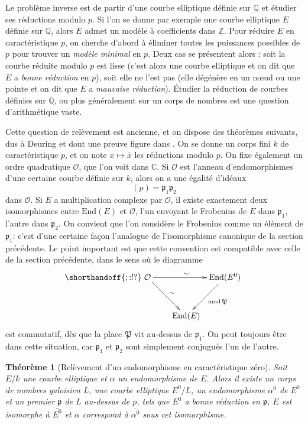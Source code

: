 \documentclass[11pt,a4paper]{article}
\newcommand{\Z}{\mathbb{Z}}
\newcommand{\C}{\mathbb{C}}
\newcommand{\Q}{\mathbb{Q}}
\renewcommand{\O}{\mathcal{O}}
\newcommand{\End}{\mathrm{End}}
\renewcommand{\frak}{\mathfrak}
\renewcommand{\v}{\vspace{5mm}}
\newtheorem*{thm}{Théorème}
\theoremstyle{definition}
\begin{document}
Le problème inverse est de partir d'une courbe elliptique définie sur $\Q$ et étudier ses réductions modulo $p$. Si l'on se donne par exemple une courbe elliptique $E$ définie sur $\Q$, alors $E$ admet un modèle à coefficients dans $\Z$. Pour réduire $E$ en caractéristique $p$, on cherche d'abord à éliminer toutes les puissances possibles de $p$ pour trouver un \emph{modèle minimal} en $p$. Deux cas se présentent alors : soit la courbe réduite modulo $p$ est lisse (c'est alors une courbe elliptique et on dit que $E$ a \emph{bonne réduction} en $p$), soit elle ne l'est pas (elle dégénère en un n\oe ud ou une pointe et on dit que $E$ a \emph{mauvaise réduction}). Étudier la réduction de courbes définies sur $\Q$, ou plus généralement sur un corps de nombres est une question d'arithmétique vaste.

\v

Cette question de relèvement est ancienne, et on dispose des théorèmes suivants, dus à Deuring et dont une preuve figure dans \cite{Lang}. On se donne un corps fini $k$ de caractéristique $p$, et on note $x\mapsto\bar{x}$ les réductions modulo $p$. On fixe également un ordre quadratique $\O$, que l'on voit dans $\C$. Si $\O$ est l'anneau d'endomorphismes d'une certaine courbe définie sur $k$, alors on a une égalité d'idéaux
$$(p) = \frak{p}_1 \frak{p}_2$$
dans $\O$. Si $E$ a multiplication complexe par $\O$, il existe exactement deux isomorphismes entre $\End(E)$ et $\O$, l'un envoyant le Frobenius de $E$ dans $\frak p_1$, l'autre dans $\frak p_2$. On convient que l'on considère le Frobenius comme un élément de $\frak p_1$: c'est d'une certaine façon l'analogue de l'isomorphisme canonique de la section précédente. Le point important est que cette convention est compatible avec celle de la section précédente, dans le sens où le diagramme
$$
\shorthandoff{;:!?}
\xymatrix @!=8mm {
\O \ar[rr]^\sim \ar[rd]^\sim & & \End(E^0) \ar[ld]^{\mathrm{mod}\,\frak P} \\
 & \End(E) & 
}
$$
est commutatif, dès que la place $\frak P$ vit au-dessus de $\frak p_1$. On peut toujours être dans cette situation, car $\frak p_1$ et $\frak p_2$ sont simplement conjugués l'un de l'autre.


\begin{thm}[Relèvement d'un endomorphisme en caractéristique zéro]

Soit $E/k$ une courbe elliptique et $\alpha$ un endomorphisme de $E$. Alors il existe un corps de nombres galoisien $L$, une courbe elliptique $E^0/L$, un endomorphisme $\alpha^0$ de $E^0$ et un premier $\frak p$ de $L$ au-dessus de $p$, tels que $E^0$ a bonne réduction en $\frak p$, $E$ est isomorphe à $\bar{E^0}$ et $\alpha$ correspond à $\bar{\alpha^0}$ sous cet isomorphisme.

\end{thm}
\end{document}
